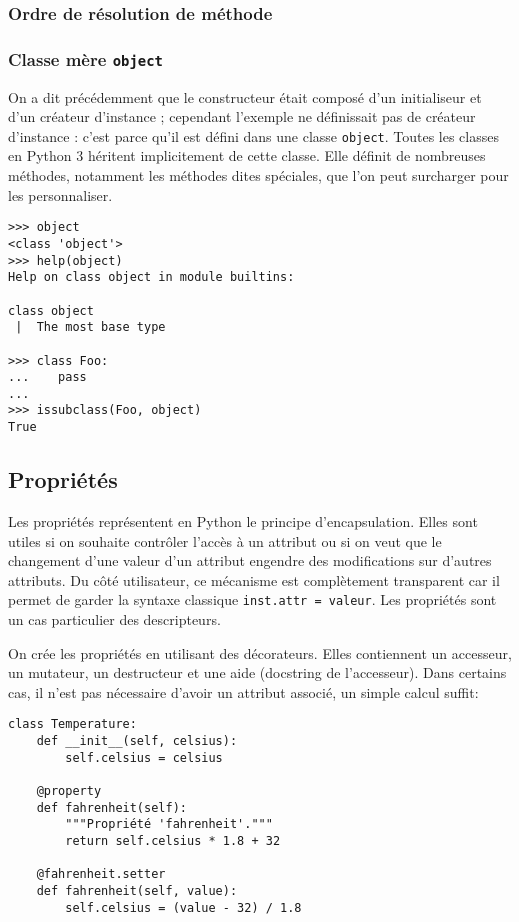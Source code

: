 \subsubsection{Ordre de résolution de méthode}

\subsubsection{Classe mère \texttt{object}}
On a dit précédemment que le constructeur était composé d'un initialiseur et d'un créateur d'instance ; cependant l'exemple ne définissait pas de créateur d'instance : c'est parce qu'il est défini dans une classe \texttt{object}. Toutes les classes en Python 3 héritent implicitement de cette classe. Elle définit de nombreuses méthodes, notamment les méthodes dites spéciales, que l'on peut surcharger pour les personnaliser.

\begin{verbatim}
>>> object
<class 'object'>
>>> help(object)
Help on class object in module builtins:

class object
 |  The most base type

>>> class Foo:
...    pass
...
>>> issubclass(Foo, object)
True
\end{verbatim}

\subsection{Propriétés}
\label{sec:proprietes}
Les propriétés représentent en Python le principe d'encapsulation. Elles sont utiles si on souhaite contrôler l'accès à un attribut ou si on veut que le changement d'une valeur d'un attribut engendre des modifications sur d'autres attributs. Du côté utilisateur, ce mécanisme est complètement transparent car il permet de garder la syntaxe classique \texttt{inst.attr = valeur}. Les propriétés sont un cas particulier des descripteurs.\medskip

On crée les propriétés en utilisant des décorateurs. Elles contiennent un accesseur, un mutateur, un destructeur et une aide (docstring de l'accesseur). Dans certains cas, il n'est pas nécessaire d'avoir un attribut associé, un simple calcul suffit:

\begin{verbatim}
class Temperature:
    def __init__(self, celsius):
        self.celsius = celsius
    
    @property
    def fahrenheit(self):
        """Propriété 'fahrenheit'."""
        return self.celsius * 1.8 + 32
    
    @fahrenheit.setter
    def fahrenheit(self, value):
        self.celsius = (value - 32) / 1.8
\end{verbatim}

